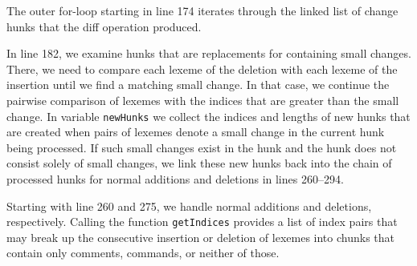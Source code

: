 The outer for-loop starting in line 174 iterates through the linked list of change hunks that the diff operation produced.

In line 182, we examine hunks that are replacements for containing small changes.  There, we need to compare each lexeme of the deletion with each lexeme of the insertion until we find a matching small change.  In that case, we continue the pairwise comparison of lexemes with the indices that are greater than the small change.  In variable \texttt{newHunks} we collect the indices and lengths of new hunks that are created when pairs of lexemes denote a small change in the current hunk being processed.  If such small changes exist in the hunk and the hunk does not consist solely of small changes, we link these new hunks back into the chain of processed hunks for normal additions and deletions in lines 260--294.

Starting with line 260 and 275, we handle normal additions and deletions, respectively.  Calling the function \texttt{getIndices} provides a list of index pairs that may break up the consecutive insertion or deletion of lexemes into chunks that contain only comments, commands, or neither of those.


